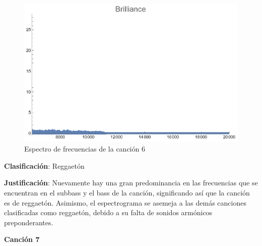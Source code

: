\documentclass[12pt, letterpaper]{article}
\begin{document}
\begin{figure}[H]
\begin{minipage}{.3\textwidth}
  \end{minipage}
  \begin{minipage}{0.03\textwidth}\end{minipage}
  \begin{minipage}{.3\textwidth}
    \centering
    \includegraphics[width=.9\linewidth]{imgs/Cancion6/brilliance.png}
  \end{minipage}
  \caption{Espectro de frecuencias de la canción 6}
  \label{fig:esp06}
\end{figure}

\textbf{Clasificación}: Reggaetón

\textbf{Justificación}: Nuevamente hay una gran predominancia en las frecuencias
que se encuentran en el subbass y el bass de la canción, significando así que
la canción es de reggaetón. Asimismo, el espectrograma se asemeja a las demás canciones
clasificadas como reggaetón, debido a su falta de sonidos armónicos preponderantes.


\newpage

\textbf{\large{Canción 7}}
\end{document}
